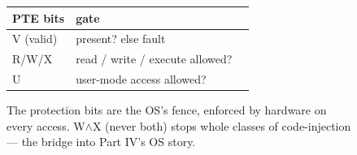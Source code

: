 \begin{figure}[htbp]
\centering
\begin{tabular}{lll}
\toprule
PTE bits & gate \\
\midrule
V (valid)   & present? else fault \\
R/W/X       & read / write / execute allowed? \\
U           & user-mode access allowed? \\
\bottomrule
\end{tabular}
\caption{The protection bits are the OS's fence, enforced by
hardware on every access. W$\wedge$X (never both) stops whole
classes of code-injection --- the bridge into Part IV's OS story.}
\label{fig:protect11}
\end{figure}
